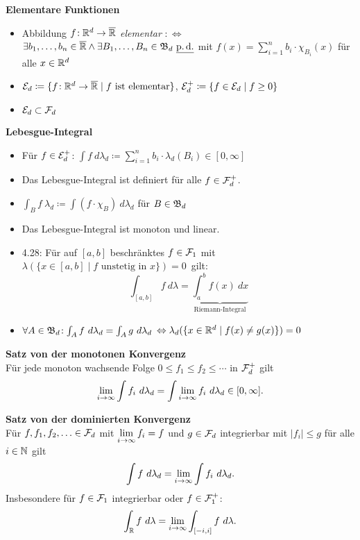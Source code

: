 \textbf{Elementare Funktionen}
\begin{itemize}

\item Abbildung $f\!: \mathbb{R}^d \to \overline{\mathbb{R}}$ \textit{elementar} $:\Leftrightarrow$\\
  $\exists b_1,\ldots,b_n\in\overline{\mathbb{R}} \wedge \exists B_1,\ldots,B_n\in\mathfrak{B}_d\
  \underline{\operatorname{p.d.}}$ mit $f(x) = \sum_{i=1}^{n} b_i \cdot \chi_{B_i}(x)$ für alle $x\in\mathbb{R}^d$

\item $\mathcal{E}_d \coloneqq \{f\!: \mathbb{R}^d \to \overline{\mathbb{R}} \mid f \text{ ist elementar}\}$,
  $\mathcal{E}_d^+ \coloneqq \{f\in\mathcal{E}_d \mid f\geq 0\}$

\item $\mathcal{E}_d \subset \mathcal{F}_d$
\end{itemize}

\textbf{Lebesgue-Integral}
\begin{itemize}
\item Für $f\in\mathcal{E}_d^+$:
  $\int f~d\lambda_d \coloneqq \sum_{i=1}^{n} b_i \cdot \lambda_d(B_i) \in [0,\infty]$

\item Das Lebesgue-Integral ist definiert für alle $f\in\mathcal{F}_d^+$.

\item $\int_B f~\lambda_d \coloneqq \int (f\cdot \chi_B)~d\lambda_d$ für $B\in\mathfrak{B}_d$

\item Das Lebesgue-Integral ist monoton und linear.

\item 4.28: Für auf $[a,b]$ beschränktes $f \in \mathcal{F}_1$ mit
  \mbox{$\lambda(\{x\in[a,b] \mid f \text{ unstetig in }x\}) = 0$ gilt:}
  \[
    \int_{[a,b]} f~d\lambda =
    \underbrace{\int_{a}^{b}f(x)~dx}_{\text{Riemann-Integral}}
  \]

\item $\forall A\in\mathfrak{B}_d\!: \int_A f~d\lambda_d = \int_A g~d\lambda_d$
  $\Leftrightarrow \lambda_d(\{x\in\mathbb{R}^d \mid f(x) \neq g(x)\}) = 0$
\end{itemize}

\textbf{Satz von der monotonen Konvergenz}\\
Für jede monoton wachsende Folge $0 \leq f_1 \leq f_2 \leq \cdots$
in $\mathcal{F}_d^+$ gilt
\[
  \lim\limits_{i\to\infty}\int f_i~d\lambda_d =
  \int\lim\limits_{i\to\infty} f_i~d\lambda_d \in [0,\infty].
\]

\textbf{Satz von der dominierten Konvergenz}\\
Für $f,f_1,f_2,\ldots\in\mathcal{F}_d$ mit $\lim\limits_{i\to\infty} f_i = f$
und $g\in\mathcal{F}_d$ integrierbar mit $|f_i| \leq g$ für alle $i\in\mathbb{N}$ gilt
\[
  \int f~d\lambda_d = \lim\limits_{i\to\infty} \int f_i~d\lambda_d.
\]
Insbesondere für $f\in\mathcal{F}_1$ integrierbar oder $f\in\mathcal{F}_1^+$:
\[
  \int_{\mathbb{R}} f~d\lambda = \lim\limits_{i\to\infty} \int_{[-i,i]} f~d\lambda.
\]


